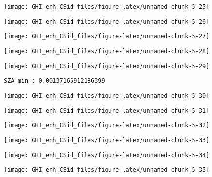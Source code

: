 \documentclass[
  10pt,
  a4paper,oneside]{article}
\begin{document}
\begin{center}\texttt{[image: GHI\_enh\_CSid\_files/figure-latex/unnamed-chunk-5-25]} \end{center}

\begin{center}\texttt{[image: GHI\_enh\_CSid\_files/figure-latex/unnamed-chunk-5-26]} \end{center}

\begin{center}\texttt{[image: GHI\_enh\_CSid\_files/figure-latex/unnamed-chunk-5-27]} \end{center}

\begin{center}\texttt{[image: GHI\_enh\_CSid\_files/figure-latex/unnamed-chunk-5-28]} \end{center}

\begin{center}\texttt{[image: GHI\_enh\_CSid\_files/figure-latex/unnamed-chunk-5-29]} \end{center}

\begin{verbatim}
SZA min : 0.00137165912186399 
\end{verbatim}

\begin{center}\texttt{[image: GHI\_enh\_CSid\_files/figure-latex/unnamed-chunk-5-30]} \end{center}

\begin{center}\texttt{[image: GHI\_enh\_CSid\_files/figure-latex/unnamed-chunk-5-31]} \end{center}

\begin{center}\texttt{[image: GHI\_enh\_CSid\_files/figure-latex/unnamed-chunk-5-32]} \end{center}

\begin{center}\texttt{[image: GHI\_enh\_CSid\_files/figure-latex/unnamed-chunk-5-33]} \end{center}

\begin{center}\texttt{[image: GHI\_enh\_CSid\_files/figure-latex/unnamed-chunk-5-34]} \end{center}

\begin{center}\texttt{[image: GHI\_enh\_CSid\_files/figure-latex/unnamed-chunk-5-35]} \end{center}
\end{document}
